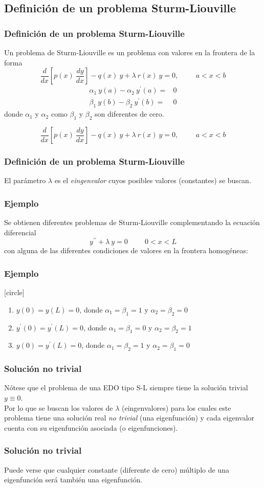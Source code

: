 \subsection{Definición de un problema Sturm-Liouville}
\begin{frame}
\frametitle{Definición de un problema Sturm-Liouville}
Un problema de Sturm-Liouville es un problema con valores en la frontera de la forma
\[\dfrac{d}{dx} \left[ p(x) \: \dfrac{dy}{dx} \right] - q(x) \: y + \lambda \: r(x) \: y = 0, \hspace{1cm} a < x < b \]
\[ \begin{split}
\alpha_{1} \: y(a) - \alpha_{2} \: y^{\prime}(a) =& 0 \\
\beta_{1}  \: y(b) - \beta_{2} \: y^{\prime}(b) =& 0
\end{split} \]
donde $\alpha_{1}$ y $\alpha_{2}$ como $\beta_{1}$ y $\beta_{2}$ son diferentes de cero.
\end{frame}
\begin{frame}
\[\dfrac{d}{dx} \left[ p(x) \: \dfrac{dy}{dx} \right] - q(x) \: y + \lambda \: r(x) \: y = 0, \hspace{1cm} a < x < b \]
\frametitle{Definición de un problema Sturm-Liouville}
El parámetro $\lambda$ es el \textit{eingenvalor} cuyos posibles valores (constantes) se buscan.
\end{frame}
\begin{frame}
\frametitle{Ejemplo}
Se obtienen diferentes problemas de Sturm-Liouville complementando la ecuación diferencial
\[ y^{\prime \prime} + \lambda \: y = 0 \hspace{1cm} 0 < x < L\]
con alguna de las diferentes condiciones de valores en la frontera homogéneas:
\end{frame}
\begin{frame}
\frametitle{Ejemplo}
[circle]
\begin{enumerate}[<+->]
\item $y(0) = y(L) = 0$, donde $\alpha_{1} = \beta_{1} = 1$ y $\alpha_{2} = \beta_{2} = 0$
\item $y^{\prime}(0) = y^{\prime}(L) = 0$, donde $\alpha_{1} = \beta_{1} = 0$ y $\alpha_{2} = \beta_{2} = 1$
\item $y(0) = y^{\prime}(L) = 0$, donde $\alpha_{1} = \beta_{2} = 1$ y $\alpha_{2} = \beta_{1} = 0$
\end{enumerate}
\end{frame}
\begin{frame}
\frametitle{Solución no trivial}
Nótese que el problema de una EDO tipo S-L siempre tiene la solución trivial $y \equiv 0$.
\\
\bigskip
Por lo que se buscan los valores de $\lambda$ (eingenvalores) para los cuales este problema tiene una solución real \textit{no trivial} (una eigenfunción) y cada eigenvalor cuenta con su eigenfunción asociada (o eigenfunciones).
\end{frame}
\begin{frame}
\frametitle{Solución no trivial}
Puede verse que cualquier constante (diferente de cero) múltiplo de una eigenfunción será también una eigenfunción.
\end{frame}
